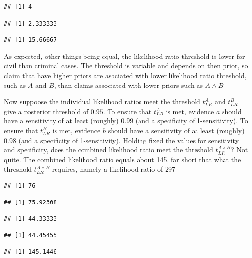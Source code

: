 \documentclass[10pt,dvipsnames,enabledeprecatedfontcommands]{scrartcl}
\begin{document}
\begin{verbatim}
## [1] 4
\end{verbatim}

\begin{verbatim}
## [1] 2.333333
\end{verbatim}

\begin{verbatim}
## [1] 15.66667
\end{verbatim}

As expected, other things being equal, the likelihood ratio threshold is
lower for civil than criminal cases. The threshold is variable and
depends on then prior, so claim that have higher priors are asociated
with lower likelihood ratio threshold, such as \(A\) and \(B\), than
claims associated with lower priors such as \(A \wedge B\).

Now suppoose the individual likelihood ratios meet the threshold
\(t_{LR}^{A}\) and \(t_{LR}^{B}\) give a posterior threshold of
\(0.95\). To ensure that \(t_{LR}^{A}\) is met, evidence \(a\) should
have a sensitivity of at least (roughly) 0.99 (and a specificity of
1-sensitivity). To ensure that \(t_{LR}^{B}\) is met, evidence \(b\)
should have a sensitivity of at least (roughly) 0.98 (and a specificity
of 1-sensitivity). Holding fixed the values for sensitivity and
specificity, does the combined likelihood ratio meet the threshold
\(t_{LR}^{A\wedge B}\)? Not quite. The combined likelihood ratio equals
about 145, far short that what the threshold \(t^{A\wedge B}_{LR}\)
requires, namely a likelihood ratio of 297

\begin{verbatim}
## [1] 76
\end{verbatim}

\begin{verbatim}
## [1] 75.92308
\end{verbatim}

\begin{verbatim}
## [1] 44.33333
\end{verbatim}

\begin{verbatim}
## [1] 44.45455
\end{verbatim}

\begin{verbatim}
## [1] 145.1446
\end{verbatim}
\end{document}
